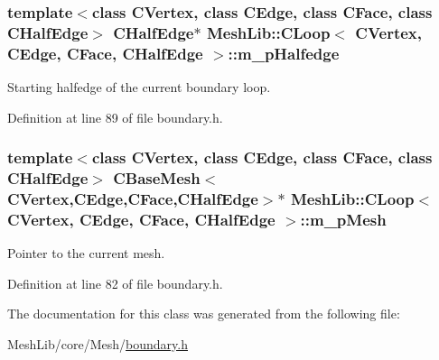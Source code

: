 \subsubsection[{\texorpdfstring{m\+\_\+p\+Halfedge}{m_pHalfedge}}]{\setlength{\rightskip}{0pt plus 5cm}template$<$class C\+Vertex, class C\+Edge, class C\+Face, class C\+Half\+Edge$>$ {\bf C\+Half\+Edge}$\ast$ {\bf Mesh\+Lib\+::\+C\+Loop}$<$ {\bf C\+Vertex}, {\bf C\+Edge}, {\bf C\+Face}, {\bf C\+Half\+Edge} $>$\+::m\+\_\+p\+Halfedge\hspace{0.3cm}{\ttfamily [protected]}}\hypertarget{class_mesh_lib_1_1_c_loop_ad8bcb68b8cafda18031803a855b1c47a}{}\label{class_mesh_lib_1_1_c_loop_ad8bcb68b8cafda18031803a855b1c47a}
Starting halfedge of the current boundary loop. 

Definition at line 89 of file boundary.\+h.

\subsubsection[{\texorpdfstring{m\+\_\+p\+Mesh}{m_pMesh}}]{\setlength{\rightskip}{0pt plus 5cm}template$<$class C\+Vertex, class C\+Edge, class C\+Face, class C\+Half\+Edge$>$ {\bf C\+Base\+Mesh}$<${\bf C\+Vertex},{\bf C\+Edge},{\bf C\+Face},{\bf C\+Half\+Edge}$>$$\ast$ {\bf Mesh\+Lib\+::\+C\+Loop}$<$ {\bf C\+Vertex}, {\bf C\+Edge}, {\bf C\+Face}, {\bf C\+Half\+Edge} $>$\+::m\+\_\+p\+Mesh\hspace{0.3cm}{\ttfamily [protected]}}\hypertarget{class_mesh_lib_1_1_c_loop_a4656ced7a75ac9a63bc5925bb667ee55}{}\label{class_mesh_lib_1_1_c_loop_a4656ced7a75ac9a63bc5925bb667ee55}
Pointer to the current mesh. 

Definition at line 82 of file boundary.\+h.



The documentation for this class was generated from the following file\+:\begin{DoxyCompactItemize}
\item 
Mesh\+Lib/core/\+Mesh/\hyperlink{boundary_8h}{boundary.\+h}\end{DoxyCompactItemize}
